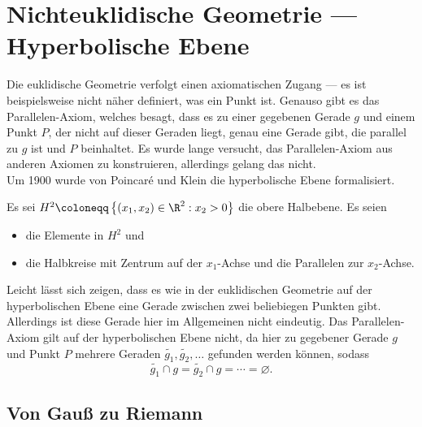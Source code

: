 \chapter{Nichteuklidische Geometrie --- Hyperbolische Ebene}

Die euklidische Geometrie verfolgt einen axiomatischen Zugang --- es ist beispielsweise nicht näher definiert, was ein Punkt ist. Genauso gibt es das Parallelen-Axiom, welches besagt, dass es zu einer gegebenen Gerade \( g \) und einem Punkt \( P \), der nicht auf dieser Geraden liegt, genau eine Gerade gibt, die parallel zu \( g \) ist und \( P \) beinhaltet. Es wurde lange versucht, das Parallelen-Axiom aus anderen Axiomen zu konstruieren, allerdings gelang das nicht. \\
Um 1900 wurde von Poincaré und Klein die hyperbolische Ebene formalisiert.

\begin{definition}
  Es sei \( H^2 \coloneqq \left \{ \left( x_1, x_2 \right) \in \R^2 : x_2 > 0 \right \} \) die obere Halbebene. Es seien
  \begin{itemize}
    \item {} die Elemente in \( H^2 \) und
    \item {} die Halbkreise mit Zentrum auf der \( x_1 \)-Achse und die Parallelen zur \( x_2 \)-Achse.
  \end{itemize}
  Leicht lässt sich zeigen, dass es wie in der euklidischen Geometrie auf der hyperbolischen Ebene eine Gerade zwischen zwei beliebiegen Punkten gibt. Allerdings ist diese Gerade hier im Allgemeinen nicht eindeutig. Das Parallelen-Axiom gilt auf der hyperbolischen Ebene nicht, da hier zu gegebener Gerade \( g \) und Punkt \( P \) mehrere Geraden \( \widetilde{g_1}, \widetilde{g_2}, \dots \) gefunden werden können, sodass
  \begin{equation*}
    \widetilde{g_1} \cap g = \widetilde{g_2} \cap g = \cdots = \varnothing\text{.}
  \end{equation*}
\end{definition}

\section{Von Gauß zu Riemann}

